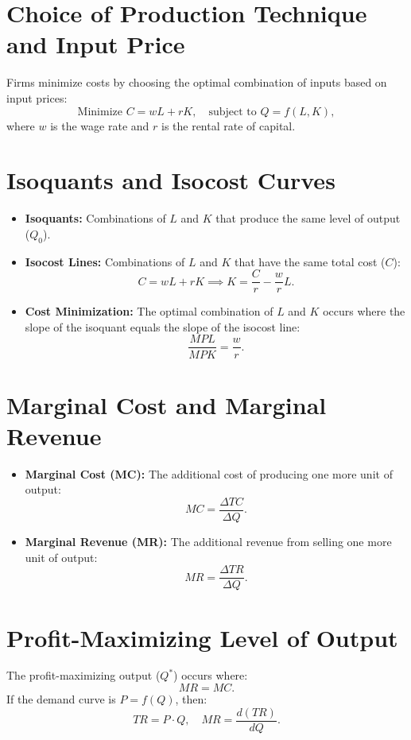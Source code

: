 \section*{Choice of Production Technique and Input Price}
Firms minimize costs by choosing the optimal combination of inputs based on input prices:
\[
\text{Minimize } C = wL + rK, \quad \text{subject to } Q = f(L, K),
\]
where \(w\) is the wage rate and \(r\) is the rental rate of capital.

\section*{Isoquants and Isocost Curves}
\begin{itemize}
    \item \textbf{Isoquants:} Combinations of \(L\) and \(K\) that produce the same level of output (\(Q_0\)).
    \item \textbf{Isocost Lines:} Combinations of \(L\) and \(K\) that have the same total cost (\(C\)):
    \[
    C = wL + rK \implies K = \frac{C}{r} - \frac{w}{r}L.
    \]
    \item \textbf{Cost Minimization:} The optimal combination of \(L\) and \(K\) occurs where the slope of the isoquant equals the slope of the isocost line:
    \[
    \frac{MPL}{MPK} = \frac{w}{r}.
    \]
\end{itemize}

\section*{Marginal Cost and Marginal Revenue}
\begin{itemize}
    \item \textbf{Marginal Cost (MC):} The additional cost of producing one more unit of output:
    \[
    MC = \frac{\Delta TC}{\Delta Q}.
    \]
    \item \textbf{Marginal Revenue (MR):} The additional revenue from selling one more unit of output:
    \[
    MR = \frac{\Delta TR}{\Delta Q}.
    \]
\end{itemize}

\section*{Profit-Maximizing Level of Output}
The profit-maximizing output (\(Q^*\)) occurs where:
\[
MR = MC.
\]
If the demand curve is \(P = f(Q)\), then:
\[
TR = P \cdot Q, \quad MR = \frac{d(TR)}{dQ}.
\]

